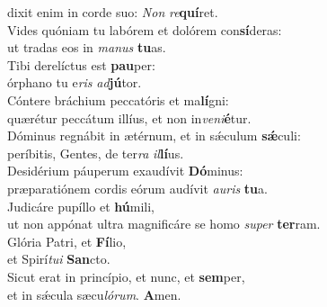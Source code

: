 \evenverse dixit enim in corde suo: \textit{Non} \textit{re}\textbf{quí}ret.\\
\oddverse Vides quóniam tu labórem et dolórem con\textbf{sí}deras:~\*\\
\oddverse ut tradas eos in \textit{ma}\textit{nus} \textbf{tu}as.\\
\evenverse Tibi derelíctus est \textbf{pau}per:~\*\\
\evenverse órphano tu e\textit{ris} \textit{ad}\textbf{jú}tor.\\
\oddverse Cóntere bráchium peccatóris et ma\textbf{lí}gni:~\*\\
\oddverse quærétur peccátum illíus, et non in\textit{ve}\textit{ni}\textbf{é}tur.\\
\evenverse Dóminus regnábit in ætérnum, et in sǽculum \textbf{sǽ}culi:~\*\\
\evenverse períbitis, Gentes, de ter\textit{ra} \textit{il}\textbf{lí}us.\\
\oddverse Desidérium páuperum exaudívit \textbf{Dó}minus:~\*\\
\oddverse præparatiónem cordis eórum audívit \textit{au}\textit{ris} \textbf{tu}a.\\
\evenverse Judicáre pupíllo et \textbf{hú}mili,~\*\\
\evenverse ut non appónat ultra magnificáre se homo \textit{su}\textit{per} \textbf{ter}ram.\\
\oddverse Glória Patri, et \textbf{Fí}lio,~\*\\
\oddverse et Spirí\textit{tu}\textit{i} \textbf{San}cto.\\
\evenverse Sicut erat in princípio, et nunc, et \textbf{sem}per,~\*\\
\evenverse et in sǽcula sæcu\textit{ló}\textit{rum}. \textbf{A}men.\\
